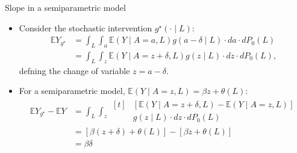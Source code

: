 \documentclass{beamer}
\newcommand{\E}{\mathbb{E}}
\begin{document}
\begin{frame}[c]{Slope in a semiparametric model}

\begin{center}
\begin{itemize}
  \itemsep10pt
  \item Consider the stochastic intervention $g^{\star}(\cdot \mid L)$:
    \begin{align*}
      \E Y_{g^{\star}} &= \int_L \int_a \E(Y \mid A = a, L) g(a - \delta
            \mid L) \cdot da \cdot dP_0(L) \\
        &= \int_L \int_z \E(Y \mid A = z + \delta, L) g(z \mid L) \cdot dz
          \cdot dP_0(L),
    \end{align*}
      defning the change of variable $z = a - \delta$.
  \item For a semiparametric model, $\E (Y \mid A = z, L) = \beta z +
    \theta(L)$:
    \begin{align*}
      \E Y_{g^{\star}} - \E Y &= \int_L \int_z
      \begin{aligned}[t]
        & [\E(Y \mid A = z + \delta, L) - \E(Y \mid A = z, L)] \\
        & g(z \mid L) \cdot dz \cdot dP_0(L)
      \end{aligned} \\
      &= [\beta (z + \delta) + \theta(L)] - [\beta z + \theta(L)] \\
      &= \beta \delta
    \end{align*}
\end{itemize}
\end{center}

\note{
}

\end{frame}

\end{document}
